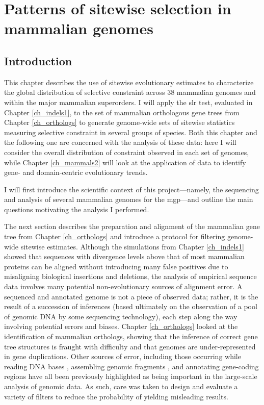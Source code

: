 \chapter{Patterns of sitewise selection in mammalian genomes}
\label{ch_mammals1}
\acresetall

\section{Introduction}

This chapter describes the use of sitewise evolutionary estimates to
characterize the global distribution of selective constraint across 38
mammalian genomes and within the major mammalian superorders. I will
apply the \ac{slr} test, evaluated in Chapter \ref{ch_indels1}, to the
set of mammalian orthologous gene trees from Chapter
\ref{ch_orthologs} to generate genome-wide sets of sitewise statistics
measuring selective constraint in several groups of \mammln
species. Both this chapter and the following one are concerned with
the analysis of these data: here I will consider the overall
distribution of constraint observed in each set of genomes, while
Chapter \ref{ch_mammals2} will look at the application of \sw data to
identify gene- and domain-centric evolutionary trends.

I will first introduce the scientific context of this
project---namely, the sequencing and analysis of several mammalian
genomes for the \ac{mgp}---and outline the main questions motivating
the analysis I performed.

The next section describes the preparation and alignment of the
mammalian gene tree from Chapter \ref{ch_orthologs} and introduce a
protocol for filtering genome-wide sitewise estimates. Although the
simulations from Chapter \ref{ch_indels1} showed that sequences with
divergence levels above that of most mammalian proteins can be aligned
without introducing many false positives due to misaligning biological
insertions and deletions, the analysis of empirical sequence data
involves many potential non-evolutionary sources of alignment error. A
sequenced and annotated genome is not a piece of observed data;
rather, it is the result of a succession of inferences (based
ultimately on the observation of a pool of genomic DNA by some
sequencing technology), each step along the way involving potential
errors and biases. Chapter \ref{ch_orthologs} looked at the
identification of mammalian orthologs, showing that the inference of
correct gene tree structures is fraught with difficulty and that \lcv
genomes are under-represented in gene duplications. Other sources of
error, including those occurring while reading DNA bases \citep{TODO},
assembling genomic fragments \citep{TODO}, and annotating gene-coding
regions \citep{TODO} have all been previously highlighted as being
important in the large-scale analysis of genomic data. As such, care
was taken to design and evaluate a variety of filters to reduce the
probability of yielding misleading results.

